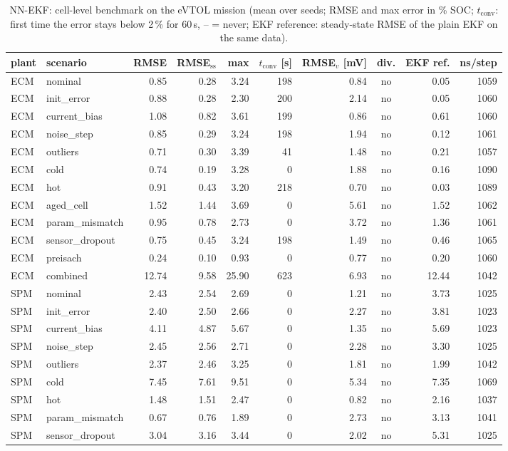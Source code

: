 \begin{table}[H]\centering\footnotesize\setlength{\tabcolsep}{4pt}
\caption{NN-EKF: cell-level benchmark on the eVTOL mission (mean over seeds; RMSE and max error in \% SOC; $t_\mathrm{conv}$: first time the error stays below 2\,\% for 60\,s, -- = never; EKF reference: steady-state RMSE of the plain EKF on the same data).}\label{tab:cell_NNEKF}
\begin{tabular}{llrrrrrcrr}\toprule
plant & scenario & RMSE & RMSE$_\mathrm{ss}$ & max & $t_\mathrm{conv}$ [s] & RMSE$_v$ [mV] & div. & EKF ref. & ns/step \\ \midrule
ECM & nominal & 0.85 & 0.28 & 3.24 & 198 & 0.84 & no & 0.05 & 1059 \\
ECM & init\_error & 0.88 & 0.28 & 2.30 & 200 & 2.14 & no & 0.05 & 1060 \\
ECM & current\_bias & 1.08 & 0.82 & 3.61 & 199 & 0.86 & no & 0.61 & 1060 \\
ECM & noise\_step & 0.85 & 0.29 & 3.24 & 198 & 1.94 & no & 0.12 & 1061 \\
ECM & outliers & 0.71 & 0.30 & 3.39 & 41 & 1.48 & no & 0.21 & 1057 \\
ECM & cold & 0.74 & 0.19 & 3.28 & 0 & 1.88 & no & 0.16 & 1090 \\
ECM & hot & 0.91 & 0.43 & 3.20 & 218 & 0.70 & no & 0.03 & 1089 \\
ECM & aged\_cell & 1.52 & 1.44 & 3.69 & 0 & 5.61 & no & 1.52 & 1062 \\
ECM & param\_mismatch & 0.95 & 0.78 & 2.73 & 0 & 3.72 & no & 1.36 & 1061 \\
ECM & sensor\_dropout & 0.75 & 0.45 & 3.24 & 198 & 1.49 & no & 0.46 & 1065 \\
ECM & preisach & 0.24 & 0.10 & 0.93 & 0 & 0.77 & no & 0.20 & 1060 \\
ECM & combined & 12.74 & 9.58 & 25.90 & 623 & 6.93 & no & 12.44 & 1042 \\
\midrule
SPM & nominal & 2.43 & 2.54 & 2.69 & 0 & 1.21 & no & 3.73 & 1025 \\
SPM & init\_error & 2.40 & 2.50 & 2.66 & 0 & 2.27 & no & 3.81 & 1023 \\
SPM & current\_bias & 4.11 & 4.87 & 5.67 & 0 & 1.35 & no & 5.69 & 1023 \\
SPM & noise\_step & 2.45 & 2.56 & 2.71 & 0 & 2.28 & no & 3.30 & 1025 \\
SPM & outliers & 2.37 & 2.46 & 3.25 & 0 & 1.81 & no & 1.99 & 1042 \\
SPM & cold & 7.45 & 7.61 & 9.51 & 0 & 5.34 & no & 7.35 & 1069 \\
SPM & hot & 1.48 & 1.51 & 2.47 & 0 & 0.82 & no & 2.16 & 1037 \\
SPM & param\_mismatch & 0.67 & 0.76 & 1.89 & 0 & 2.73 & no & 3.13 & 1041 \\
SPM & sensor\_dropout & 3.04 & 3.16 & 3.44 & 0 & 2.02 & no & 5.31 & 1025 \\
\bottomrule\end{tabular}\end{table}
